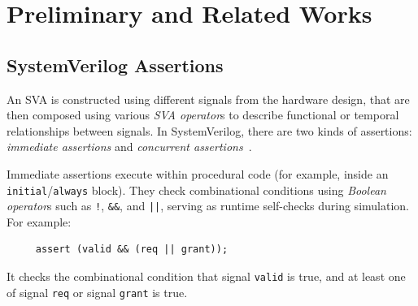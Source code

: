 \section{Preliminary and Related Works}
\label{sec:Preliminary}
\subsection{SystemVerilog Assertions}
\label{subsec:SVA}
An SVA is constructed using different signals from the hardware design, that are then composed using various \textit{SVA operator}s to describe functional or temporal relationships between signals.
In SystemVerilog, there are two kinds of assertions: \textit{immediate assertions} and \textit{concurrent assertions}~\cite{IEEEStd}.

Immediate assertions execute  within procedural code (for example, inside an \verb|initial|/\verb|always| block). 
They check combinational conditions using \textit{Boolean operator}s such as \texttt{!}, \texttt{\&\&}, and \texttt{||}, serving as runtime self-checks during simulation.
For example:
\begin{verbatim}
     assert (valid && (req || grant));
\end{verbatim}
It checks the combinational condition that signal \verb|valid| is true, and at least one of signal \verb|req| or signal \verb|grant| is true.

